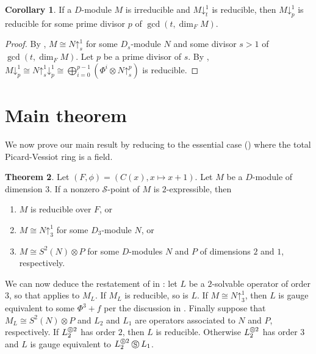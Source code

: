 \documentclass[11pt,reqno]{amsart}
\theoremstyle{definition}
\newtheorem{theorem}{Theorem}[section]
\newtheorem{corollary}[theorem]{Corollary}
\newcommand{\cs}{\mathbin{\circledS}}
\newcommand{\pda}{\mathord{\downarrow}}
\newcommand{\pua}{\mathord{\uparrow}}
\begin{document}
\begin{corollary}
\label{cor:absolute-irreducibility}
    If a $D$-module $M$ is irreducible and $M\pda^{1}_{t}$ is reducible,
    then $M\pda^1_p$ is reducible for some prime divisor $p$ of $\gcd(t,\dim_{F} M)$.
\end{corollary}
\begin{proof}
    By , $M\cong N\pua_s^1$ for some $D_s$-module $N$ and some divisor $s>1$ of $\gcd(t,\dim_{F}M)$.
    Let $p$ be a prime divisor of $s$. By , $M\pda^1_p\cong N\pua^1_s\pda^1_p\cong \bigoplus_{i=0}^{p-1} \left(\Phi^{i}\otimes N\pua^p_s\right)$ is reducible.
\end{proof}

\section{Main theorem}
\label{section:main}
We now prove our main result by reducing to the essential case () where the total Picard-Vessiot ring is a field. 

\begin{theorem}
\label{thm:general-classification}
Let $(F,\phi)= (C (x), x\mapsto x+1)$.
Let $M$ be a $D$-module of dimension $3$. 
If a nonzero $\mathcal{S}$-point of $M$ is $2$-expressible, then
\begin{enumerate}
    \item\label{general-case-1} $M$ is reducible over $F$, or
    \item\label{general-case-2} $M \cong N\pua^{1}_{3}$ for some $D_{3}$-module $N$, or
    \item\label{general-case-3} $M\cong S^{2}(N)\otimes P$ for some $D$-modules $N$ and $P$ of dimensions $2$ and $1$, respectively.
\end{enumerate}
\end{theorem}

We can now deduce the restatement of 
 in : 
let $L$ be a $2$-solvable operator of order 3, so that  applies to $M_{L}$. If $M_{L}$ is reducible, so is $L$. 
If $M\cong N\pua^{1}_{3}$, then $L$ is gauge equivalent to some $\Phi^{3}+f$ per the discussion in . 
Finally suppose that $M_{L}\cong S^{2}(N)\otimes P$ and $L_{2}$ and $L_{1}$ are operators associated to $N$ and $P$, respectively. 
If $L_{2}^{\cs 2}$ has order $2$, then $L$ is reducible. 
Otherwise $L_{2}^{\cs 2}$ has order $3$ and $L$ is gauge equivalent to $L_{2}^{\cs 2}\cs L_{1}$.
\end{document}
